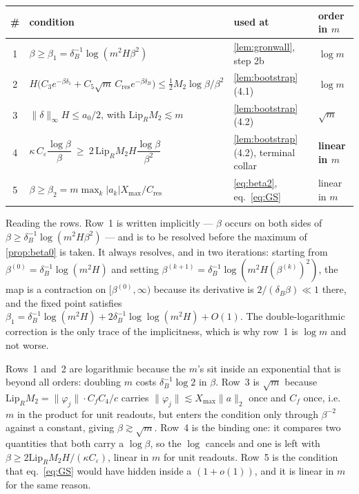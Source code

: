 \documentclass[11pt]{article}
\theoremstyle{definition}
\theoremstyle{remark}
\begin{document}
\begin{center}
\small
\begin{tabular}{clll}
\hline
\# & condition & used at & order in $m$\\
\hline
1 & $\beta\ge\beta_1=\delta_B^{-1}\log(m^2H\beta^2)$
  & \cref{lem:gronwall}, step 2b
  & $\log m$\\
2 & $H\bigl(C_3e^{-\beta\delta_1}+C_5\sqrt m\,C_{\mathrm{res}}e^{-\beta\delta_B}\bigr)
     \le\tfrac12M_2\log\beta/\beta^2$
  & \cref{lem:bootstrap} (4.1)
  & $\log m$\\
3 & $\|\delta\|_\infty H\le a_0/2$, with
    $\mathrm{Lip}_R M_2\lesssim m$
  & \cref{lem:bootstrap} (4.2)
  & $\sqrt m$ \\
4 & $\kappa\,C_\varepsilon\dfrac{\log\beta}{\beta}
     \ \ge\ 2\,\mathrm{Lip}_R M_2 H\dfrac{\log\beta}{\beta^{2}}$
  & \cref{lem:bootstrap} (4.2), terminal collar
  & \textbf{linear in $m$}\\
5 & $\beta\ge\beta_2=m\max_k|a_k|X_{\max}/C_{\mathrm{res}}$
  & \eqref{eq:beta2}, eq.~\eqref{eq:GS}
  & linear in $m$\\
\hline
\end{tabular}
\end{center}

\noindent Reading the rows. Row~1 is written implicitly --- $\beta$ occurs on
both sides of $\beta\ge\delta_B^{-1}\log(m^2H\beta^2)$ --- and is to be resolved
before the maximum of \cref{prop:beta0} is taken. It always resolves, and in two
iterations: starting from $\beta^{(0)}=\delta_B^{-1}\log(m^2H)$ and setting
$\beta^{(k+1)}=\delta_B^{-1}\log(m^2H(\beta^{(k)})^2)$, the map is a contraction
on $[\beta^{(0)},\infty)$ because its derivative is $2/(\delta_B\beta)\ll1$ there,
and the fixed point satisfies
$\beta_1=\delta_B^{-1}\log(m^2H)+2\delta_B^{-1}\log\log(m^2H)+O(1)$. The
double-logarithmic correction is the only trace of the implicitness, which is why
row~1 is $\log m$ and not worse.

Rows~1 and~2 are logarithmic because the $m$'s sit
inside an exponential that is beyond all orders: doubling $m$ costs
$\delta_B^{-1}\log2$ in $\beta$. Row~3 is $\sqrt m$ because
$\mathrm{Lip}_RM_2=\|\varphi_j\|\cdot C_fC_4/c$ carries $\|\varphi_j\|\lesssim
X_{\max}\|a\|_2$ once and $C_f$ once, i.e.\ $m$ in the product for unit readouts,
but enters the condition only through $\beta^{-2}$ against a constant, giving
$\beta\gtrsim\sqrt m$. Row~4 is the binding one: it compares two quantities that
both carry a $\log\beta$, so the $\log$ cancels and one is left with
$\beta\ge2\mathrm{Lip}_RM_2H/(\kappa C_\varepsilon)$, linear in $m$ for unit
readouts. Row~5 is the condition that eq.~\eqref{eq:GS} would have hidden inside
a $(1+o(1))$, and it is linear in $m$ for the same reason.
\end{document}
